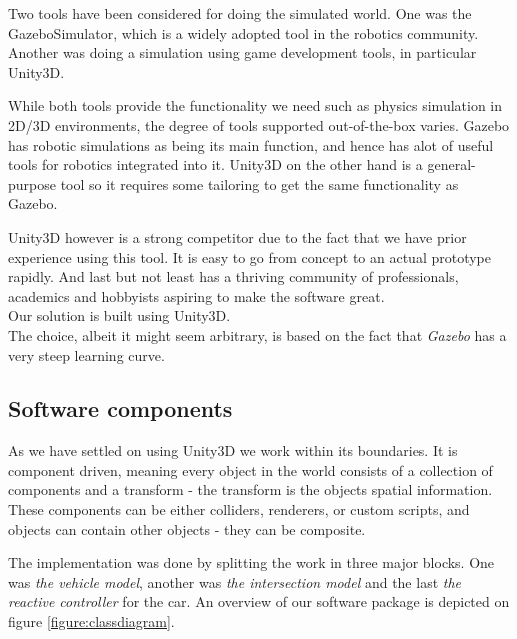Two tools have been considered for doing the simulated world. One was the GazeboSimulator, which is a widely adopted tool in the robotics community.
Another was doing a simulation using game development tools, in particular Unity3D.

While both tools provide the functionality we need such as physics simulation in 2D/3D  environments, the degree of tools supported out-of-the-box varies.
Gazebo has robotic simulations as being its main function, and hence has alot of useful tools for robotics integrated into it.
Unity3D on the other hand is a general-purpose tool so it requires some tailoring to get the same functionality as Gazebo.

Unity3D however is a strong competitor due to the fact that we have prior experience using this tool. It is easy to go from concept to an actual prototype rapidly. And last but not least has a thriving community of professionals, academics and hobbyists aspiring to make the software great.\\
Our solution is built using Unity3D.\\

The choice, albeit it might seem arbitrary, is based on the fact that \textit{Gazebo} has a very steep learning curve.

\subsection{Software components}
As we have settled on using Unity3D we work within its boundaries.
It is component driven, meaning every object in the world consists of a collection of components and a transform - the transform is the objects spatial information.
These components can be either colliders, renderers, or custom scripts, and objects can contain other objects - they can be composite.

The implementation was done by splitting the work in three major blocks. One was \textit{the vehicle model}, another was \textit{the intersection model} and the last \textit{the reactive controller} for the car.
An overview of our software package is depicted on figure \ref{figure:classdiagram}.


